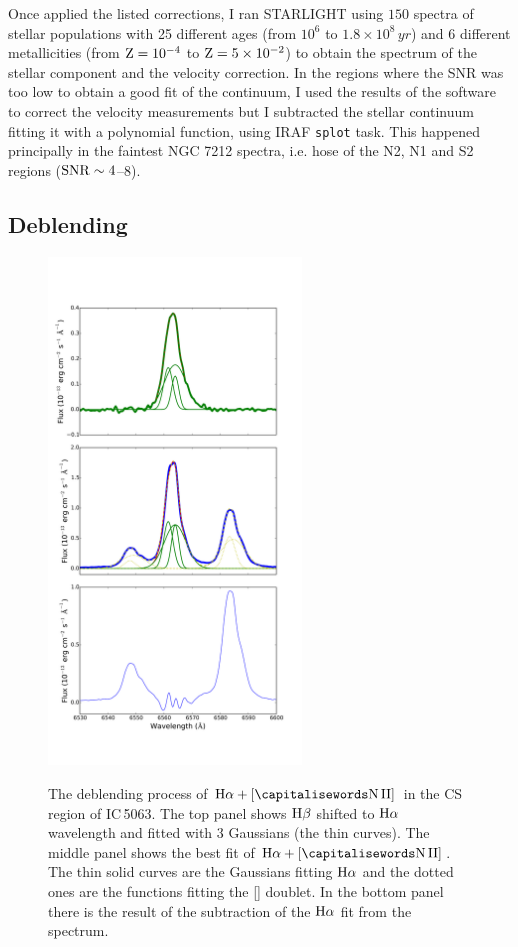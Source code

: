 \documentclass[../main.tex]{subfiles}
\begin{document}
Once applied the listed corrections, I ran STARLIGHT using $150$ spectra of stellar populations with 25 different ages (from $10^6$ to $1.8\times10^8\,\si{yr}$) and 6 different metallicities (from $\rm Z=10^{-4}$ to $\rm Z=5\times 10^{-2}$) to obtain the spectrum of the stellar component and the velocity correction.
In the regions where the SNR was too low to obtain a good fit of the continuum, I used the results of the software to correct the velocity measurements but I subtracted the stellar continuum fitting it with a polynomial function, using IRAF \verb!splot! task.
This happened principally in the faintest NGC 7212 spectra, i.e. hose of the N2, N1 and S2 regions ($\rm SNR\sim 4$--$8$).



\subsection{Deblending}
\label{sec:deblending}

\begin{figure}
\centering
\includegraphics[width=0.6\textwidth]{images/paper1/ha2.pdf} \\
\caption[]{The deblending process of $\Ha + [\ion{N}{II}]$ in the CS region of IC\,5063. The top panel shows $\rm H\beta$ shifted to $\rm H\alpha$ wavelength and fitted with $3$ Gaussians (the thin curves). The middle panel shows the best fit of $\Ha+[\ion{N}{II}]$. The thin solid curves are the Gaussians fitting $\rm H\alpha$ and the dotted ones are the functions fitting the [] doublet. In the bottom panel there is the result of the subtraction of the $\rm H\alpha$ fit from the spectrum. }
\label{fig:hadeb}
\end{figure}
\end{document}
